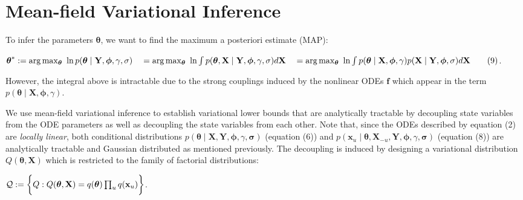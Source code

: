 \section{Mean-field Variational Inference}

\begin{par}
To infer the parameters $\boldsymbol\theta$, we want to find the maximum a posteriori estimate (MAP):
\end{par} \vspace{1em}
\begin{par}
$\boldsymbol\theta^* := \mathrm{arg} \max_{\boldsymbol\theta} ~ \ln p(\boldsymbol\theta \mid\mathbf{Y},\boldsymbol\phi,\gamma,\mathbf \sigma)\\ \quad= \mathrm{arg}\max_{\boldsymbol\theta} ~ \ln \int  p(\boldsymbol\theta,\mathbf{X} \mid\mathbf{Y},\boldsymbol\phi,\gamma,\mathbf\sigma) d\mathbf{X}\\ \quad= \mathrm{arg}\max_{\boldsymbol\theta} ~ \ln \int p(\boldsymbol\theta \mid \mathbf{X},\boldsymbol\phi,\gamma)p(\mathbf{X} \mid \mathbf{Y}, \boldsymbol\phi,\mathbf\sigma) d\mathbf{X} \qquad(9)$.
\end{par} \vspace{1em}
\begin{par}
However, the integral above is intractable due to the strong couplings induced by the nonlinear ODEs $\mathbf{f}$ which appear in the term $p(\boldsymbol\theta \mid \mathbf{X},\boldsymbol\phi,\gamma)$.
\end{par} \vspace{1em}
\begin{par}
We use mean-field variational inference to establish variational lower bounds that are analytically tractable by decoupling state variables from the ODE parameters as well as decoupling the state variables from each other. Note that, since the ODEs described by equation (2) are \textit{locally linear}, both conditional distributions $p(\boldsymbol\theta \mid\mathbf{X},\mathbf{Y},\boldsymbol\phi,\gamma,\mathbf\sigma)$ (equation (6)) and $p(\mathbf{x}_u \mid \boldsymbol\theta,\mathbf{X}_{-u},\mathbf{Y},\boldsymbol\phi,\gamma,\mathbf\sigma)$ (equation (8)) are analytically tractable and Gaussian distributed as mentioned previously. The decoupling is induced by designing a variational distribution $Q(\boldsymbol\theta,\mathbf{X})$ which is restricted to the family of factorial distributions:
\end{par} \vspace{1em}
\begin{par}
$\mathcal{Q} := \bigg{\{} Q : Q(\boldsymbol\theta,\mathbf{X}) = q(\boldsymbol\theta) \prod_uq(\mathbf{x}_u) \bigg{\}}$.
\end{par} \vspace{1em}
